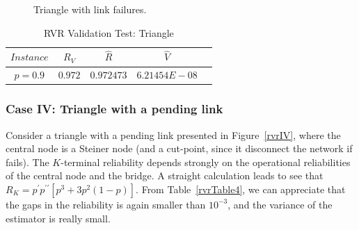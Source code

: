\begin{figure}[H]
\begin{center}
\caption{Triangle with link failures. \label{rvrIII}}
\end{center}
\end{figure}

\begin{table}[H]
\caption{RVR Validation Test: Triangle} %
\centering  %
\begin{tabular}{|c|c|c|c|c|} %
\hline	$Instance$   &	$R_{V}$ & $\hat{R}$&  $\hat{V}$ \\
\hline	$p=0.9$	& $0.972$ &	$0.972473$ 	&	$6.21454E-08$	\\
\hline
\end{tabular}
\label{rvrTable3} %
\end{table}

\subsubsection*{Case IV: Triangle with a pending link}
Consider a triangle with a pending link presented in Figure~\ref{rvrIV}, where the central node is a Steiner node (and a cut-point, since it disconnect the network if fails). The $K$-terminal reliability depends strongly on the operational reliabilities of the central node and the bridge. A straight calculation leads to see that 
$R_K = p^{\prime}p^{\prime \prime} [p^3+3p^{2}(1-p)]$. From Table~\ref{rvrTable4}, we can appreciate 
that the gaps in the reliability is again smaller than $10^{-3}$, and the variance of the estimator is really small. 

